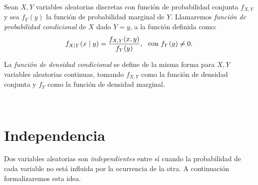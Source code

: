 \documentclass[oneside,openright,titlepage,numbers=noenddot,openany,headinclude,footinclude=true,
cleardoublepage=empty,abstractoff,BCOR=5mm,paper=a4,fontsize=12pt,main=spanish]{scrreprt}
\begin{document}
\begin{definition} \label{def:funcprobcond}
Sean $X,Y$ variables aleatorias discretas con función de probabilidad conjunta $f_{X,Y}$ y sea $f_{Y}(y)$ la función de probabilidad marginal de $Y$. Llamaremos \textit{función de probabilidad condicional} de $X$ dado $Y=y$, a la función definida como: $$f_{X\mid Y}(x \mid y)=\frac{\displaystyle f_{X,Y}(x,y)}{\displaystyle f_Y(y)}, \ \ \text{con} \ f_{Y}(y) \neq 0.$$

\begin{remark}
La \textit{función de densidad condicional} se define de la misma forma para $X,Y$ variables aleatorias continuas, tomando $f_{X,Y}$ como la función de densidad conjunta y $f_{Y}$ como la función de densidad marginal.
\end{remark}
\end{definition}\

\section{Independencia}

Dos variables aleatorias son \textit{independientes} entre sí cuando la probabilidad de cada variable no está influida por la ocurrencia de la otra. A continuación formalizaremos esta idea.\\

\end{document}
